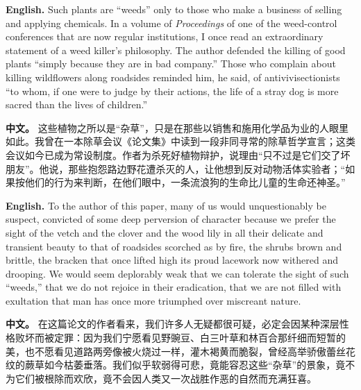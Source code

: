 \noindent\textbf{English.} Such plants are ``weeds'' only to those who make a business of selling and applying chemicals. In a volume of \textit{Proceedings} of one of the weed-control conferences that are now regular institutions, I once read an extraordinary statement of a weed killer's philosophy. The author defended the killing of good plants ``simply because they are in bad company.'' Those who complain about killing wildflowers along roadsides reminded him, he said, of antivivisectionists ``to whom, if one were to judge by their actions, the life of a stray dog is more sacred than the lives of children.''
\par
\noindent\textbf{中文。} 这些植物之所以是“杂草”，只是在那些以销售和施用化学品为业的人眼里如此。我曾在一本除草会议《论文集》中读到一段非同寻常的除草哲学宣言；这类会议如今已成为常设制度。作者为杀死好植物辩护，说理由“只不过是它们交了坏朋友”。他说，那些抱怨路边野花遭杀灭的人，让他想到反对动物活体实验者；“如果按他们的行为来判断，在他们眼中，一条流浪狗的生命比儿童的生命还神圣。”
\par\medskip

\noindent\textbf{English.} To the author of this paper, many of us would unquestionably be suspect, convicted of some deep perversion of character because we prefer the sight of the vetch and the clover and the wood lily in all their delicate and transient beauty to that of roadsides scorched as by fire, the shrubs brown and brittle, the bracken that once lifted high its proud lacework now withered and drooping. We would seem deplorably weak that we can tolerate the sight of such ``weeds,'' that we do not rejoice in their eradication, that we are not filled with exultation that man has once more triumphed over miscreant nature.
\par
\noindent\textbf{中文。} 在这篇论文的作者看来，我们许多人无疑都很可疑，必定会因某种深层性格败坏而被定罪：因为我们宁愿看见野豌豆、白三叶草和林百合那纤细而短暂的美，也不愿看见道路两旁像被火烧过一样，灌木褐黄而脆裂，曾经高举骄傲蕾丝花纹的蕨草如今枯萎垂落。我们似乎软弱得可悲，竟能容忍这些“杂草”的景象，竟不为它们被根除而欢欣，竟不会因人类又一次战胜作恶的自然而充满狂喜。
\par\medskip

